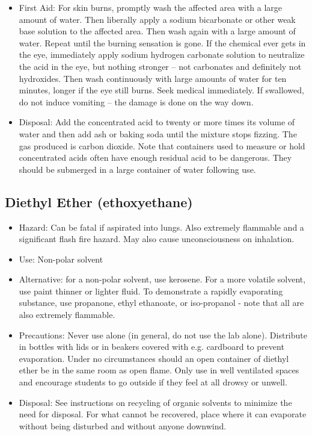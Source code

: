 \begin{itemize}
\item{First Aid: For skin burns, promptly wash the affected area 
with a large amount of water. 
Then liberally apply a sodium bicarbonate 
or other weak base solution to the affected area. 
Then wash again with a large amount of water. 
Repeat until the burning sensation is gone. 
If the chemical ever gets in the eye, 
immediately apply sodium hydrogen carbonate solution 
to neutralize the acid in the eye, but nothing stronger -- 
not carbonates and definitely not hydroxides. 
Then wash continuously with large amounts of water for ten minutes, 
longer if the eye still burns. 
Seek medical immediately. 
If swallowed, do not induce vomiting -- 
the damage is done on the way down.}

\item{Disposal: Add the concentrated acid to twenty or more 
times its volume of water and then add ash or baking soda 
until the mixture stops fizzing. 
The gas produced is carbon dioxide. 
Note that containers used to measure or hold concentrated acids 
often have enough residual acid to be dangerous. 
They should be submerged in a large container of water following use.}

\end{itemize}

\subsection{Diethyl Ether (ethoxyethane)}

\begin{itemize}

\item{Hazard: Can be fatal if aspirated into lungs. 
Also extremely flammable and a significant flash fire hazard. 
May also cause unconsciousness on inhalation.}

\item{Use: Non-polar solvent}

\item{Alternative: for a non-polar solvent, use kerosene. 
For a more volatile solvent, use paint thinner or lighter fluid. 
To demonstrate a rapidly evaporating substance, 
use propanone, ethyl ethanoate, or iso-propanol - 
note that all are also extremely flammable.}

\item{Precautions: Never use alone (in general, do not use the lab alone). 
Distribute in bottles with lids 
or in beakers covered with e.g. cardboard to prevent evaporation. 
Under no circumstances should an open container of diethyl ether 
be in the same room as open flame. 
Only use in well ventilated spaces and encourage students to go outside 
if they feel at all drowsy or unwell.}

\item{Disposal: See instructions on recycling of organic solvents 
to minimize the need for disposal. 
For what cannot be recovered, 
place where it can evaporate without being disturbed 
and without anyone downwind.}

\end{itemize}

